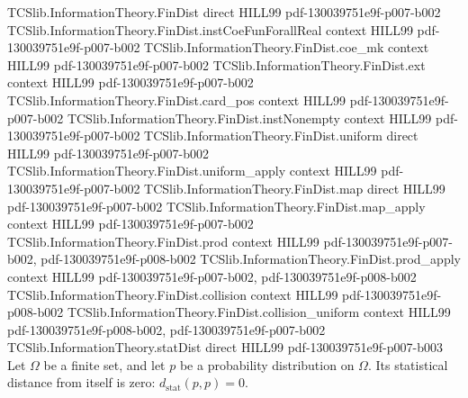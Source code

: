 \begin{theorem}
\label{TCSlib.InformationTheory.statDist_self}
\leanok
\proofstep
  {TCSlib.InformationTheory.FinDist}
  {direct}
  {HILL99}
  {pdf-130039751e9f-p007-b002}
\proofstep
  {TCSlib.InformationTheory.FinDist.instCoeFunForallReal}
  {context}
  {HILL99}
  {pdf-130039751e9f-p007-b002}
\proofstep
  {TCSlib.InformationTheory.FinDist.coe_mk}
  {context}
  {HILL99}
  {pdf-130039751e9f-p007-b002}
\proofstep
  {TCSlib.InformationTheory.FinDist.ext}
  {context}
  {HILL99}
  {pdf-130039751e9f-p007-b002}
\proofstep
  {TCSlib.InformationTheory.FinDist.card_pos}
  {context}
  {HILL99}
  {pdf-130039751e9f-p007-b002}
\proofstep
  {TCSlib.InformationTheory.FinDist.instNonempty}
  {context}
  {HILL99}
  {pdf-130039751e9f-p007-b002}
\proofstep
  {TCSlib.InformationTheory.FinDist.uniform}
  {direct}
  {HILL99}
  {pdf-130039751e9f-p007-b002}
\proofstep
  {TCSlib.InformationTheory.FinDist.uniform_apply}
  {context}
  {HILL99}
  {pdf-130039751e9f-p007-b002}
\proofstep
  {TCSlib.InformationTheory.FinDist.map}
  {direct}
  {HILL99}
  {pdf-130039751e9f-p007-b002}
\proofstep
  {TCSlib.InformationTheory.FinDist.map_apply}
  {context}
  {HILL99}
  {pdf-130039751e9f-p007-b002}
\proofstep
  {TCSlib.InformationTheory.FinDist.prod}
  {context}
  {HILL99}
  {pdf-130039751e9f-p007-b002,
    pdf-130039751e9f-p008-b002}
\proofstep
  {TCSlib.InformationTheory.FinDist.prod_apply}
  {context}
  {HILL99}
  {pdf-130039751e9f-p007-b002,
    pdf-130039751e9f-p008-b002}
\proofstep
  {TCSlib.InformationTheory.FinDist.collision}
  {context}
  {HILL99}
  {pdf-130039751e9f-p008-b002}
\proofstep
  {TCSlib.InformationTheory.FinDist.collision_uniform}
  {context}
  {HILL99}
  {pdf-130039751e9f-p008-b002,
    pdf-130039751e9f-p007-b002}
\proofstep
  {TCSlib.InformationTheory.statDist}
  {direct}
  {HILL99}
  {pdf-130039751e9f-p007-b003}
Let $\Omega$ be a finite set, and let $p$ be a probability distribution on $\Omega$. Its
statistical distance from itself is zero: $d_{\mathrm{stat}}(p,p)=0$.
\end{theorem}

